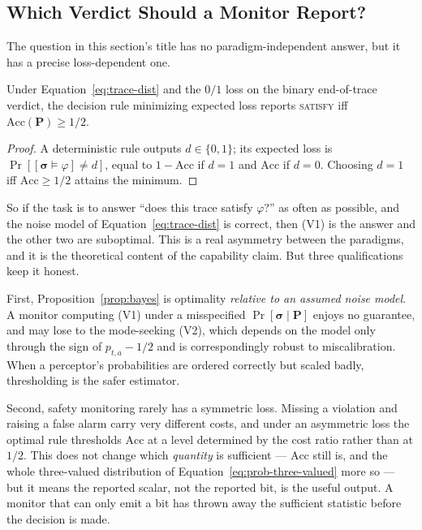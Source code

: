 \subsection{Which Verdict Should a Monitor Report?}
\label{sec:prob-which}

The question in this section's title has no paradigm-independent answer, but it has a precise loss-dependent one.

\begin{proposition}
\label{prop:bayes}
Under Equation~\eqref{eq:trace-dist} and the $0/1$ loss on the binary end-of-trace verdict, the decision rule minimizing expected loss reports \textsc{satisfy} iff $\mathrm{Acc}(\mathbf{P}) \ge 1/2$.
\end{proposition}

\begin{proof}
A deterministic rule outputs $d \in \{0,1\}$; its expected loss is $\Pr[[\boldsymbol{\sigma} \models \varphi] \neq d]$, equal to $1 - \mathrm{Acc}$ if $d=1$ and $\mathrm{Acc}$ if $d=0$. Choosing $d = 1$ iff $\mathrm{Acc} \ge 1/2$ attains the minimum.
\end{proof}

So if the task is to answer ``does this trace satisfy $\varphi$?'' as often as possible, and the noise model of Equation~\eqref{eq:trace-dist} is correct, then (V1) is the answer and the other two are suboptimal. This is a real asymmetry between the paradigms, and it is the theoretical content of the capability claim. But three qualifications keep it honest.

First, Proposition~\ref{prop:bayes} is optimality \emph{relative to an assumed noise model}. A monitor computing (V1) under a misspecified $\Pr[\boldsymbol{\sigma} \mid \mathbf{P}]$ enjoys no guarantee, and may lose to the mode-seeking (V2), which depends on the model only through the sign of $p_{t,a} - 1/2$ and is correspondingly robust to miscalibration. When a perceptor's probabilities are ordered correctly but scaled badly, thresholding is the safer estimator.

Second, safety monitoring rarely has a symmetric loss. Missing a violation and raising a false alarm carry very different costs, and under an asymmetric loss the optimal rule thresholds $\mathrm{Acc}$ at a level determined by the cost ratio rather than at $1/2$. This does not change which \emph{quantity} is sufficient --- $\mathrm{Acc}$ still is, and the whole three-valued distribution of Equation~\eqref{eq:prob-three-valued} more so --- but it means the reported scalar, not the reported bit, is the useful output. A monitor that can only emit a bit has thrown away the sufficient statistic before the decision is made.

